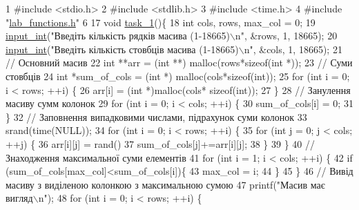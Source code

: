 \begin{DoxyCodeInclude}
1 \textcolor{preprocessor}{#include <stdio.h>}
2 \textcolor{preprocessor}{#include <stdlib.h>}
3 \textcolor{preprocessor}{#include <time.h>}
4 \textcolor{preprocessor}{#include "\hyperlink{lab__functions_8h}{lab\_functions.h}"}
6 
17 \textcolor{keywordtype}{void} \hyperlink{main_8c_a2e10594dc040249a898e2880b4c64322}{task\_1}()\{
18     \textcolor{keywordtype}{int} cols, rows, max\_col = 0;
19     \hyperlink{lab__functions_8h_a6f453bc035d85e967bd5032eca31a155}{input\_int}(\textcolor{stringliteral}{"Введіть кількість рядків масива (1-18665)\(\backslash\)n"}, &rows, 1, 18665);
20     \hyperlink{lab__functions_8h_a6f453bc035d85e967bd5032eca31a155}{input\_int}(\textcolor{stringliteral}{"Введіть кількість стовбців масива (1-18665)\(\backslash\)n"}, &cols, 1, 18665);
21     \textcolor{comment}{// Основний масив}
22     \textcolor{keywordtype}{int} **arr = (\textcolor{keywordtype}{int} **) malloc(rows*\textcolor{keyword}{sizeof}(\textcolor{keywordtype}{int} *));
23     \textcolor{comment}{// Суми стовбців}
24     \textcolor{keywordtype}{int} *sum\_of\_cols = (\textcolor{keywordtype}{int} *) malloc(cols*\textcolor{keyword}{sizeof}(\textcolor{keywordtype}{int}));
25     \textcolor{keywordflow}{for} (\textcolor{keywordtype}{int} i = 0; i < rows; ++i) \{
26         arr[i] = (\textcolor{keywordtype}{int} *)malloc(cols* \textcolor{keyword}{sizeof}(\textcolor{keywordtype}{int}));
27     \}
28     \textcolor{comment}{// Занулення масиву сумм колонок}
29     \textcolor{keywordflow}{for} (\textcolor{keywordtype}{int} i = 0; i < cols; ++i) \{
30         sum\_of\_cols[i] = 0;
31     \}
32     \textcolor{comment}{// Заповнення випадковими числами, підрахунок суми колонок}
33     srand(time(NULL));
34     \textcolor{keywordflow}{for} (\textcolor{keywordtype}{int} i = 0; i < rows; ++i) \{
35         \textcolor{keywordflow}{for} (\textcolor{keywordtype}{int} j = 0; j < cols; ++j) \{
36             arr[i][j] = rand()%
37             sum\_of\_cols[j]+=arr[i][j];
38         \}
39     \}
40     \textcolor{comment}{// Знаходження максимальної суми елементів}
41     \textcolor{keywordflow}{for} (\textcolor{keywordtype}{int} i = 1; i < cols; ++i) \{
42         \textcolor{keywordflow}{if} (sum\_of\_cols[max\_col]<sum\_of\_cols[i])\{
43             max\_col = i;
44         \}
45     \}
46     \textcolor{comment}{// Вивід масиву з виділеною колонкою з максимальною сумою}
47     printf(\textcolor{stringliteral}{"Масив має вигляд\(\backslash\)n"});
48     \textcolor{keywordflow}{for} (\textcolor{keywordtype}{int} i = 0; i < rows; ++i) \{

\end{DoxyCodeInclude}
